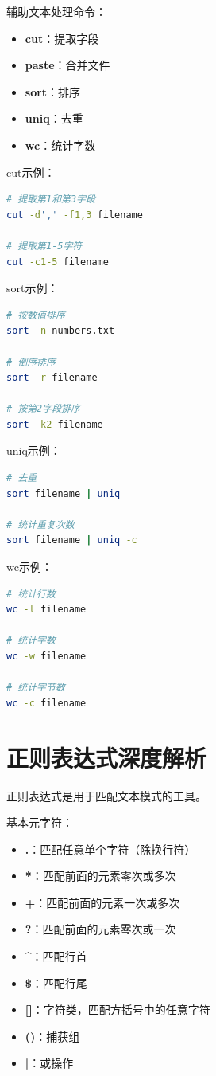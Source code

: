 \documentclass[12pt,UTF8]{ctexbook}
\begin{document}
辅助文本处理命令：

\begin{itemize}
    \item \textbf{cut}：提取字段
    \item \textbf{paste}：合并文件
    \item \textbf{sort}：排序
    \item \textbf{uniq}：去重
    \item \textbf{wc}：统计字数
\end{itemize}

cut示例：
\begin{lstlisting}[language=bash]
# 提取第1和第3字段
cut -d',' -f1,3 filename

# 提取第1-5字符
cut -c1-5 filename
\end{lstlisting}

sort示例：
\begin{lstlisting}[language=bash]
# 按数值排序
sort -n numbers.txt

# 倒序排序
sort -r filename

# 按第2字段排序
sort -k2 filename
\end{lstlisting}

uniq示例：
\begin{lstlisting}[language=bash]
# 去重
sort filename | uniq

# 统计重复次数
sort filename | uniq -c
\end{lstlisting}

wc示例：
\begin{lstlisting}[language=bash]
# 统计行数
wc -l filename

# 统计字数
wc -w filename

# 统计字节数
wc -c filename
\end{lstlisting}

\section{正则表达式深度解析}
\label{sec:regex}

正则表达式是用于匹配文本模式的工具。

基本元字符：
\begin{itemize}
    \item \textbf{.}：匹配任意单个字符（除换行符）
    \item \textbf{*}：匹配前面的元素零次或多次
    \item \textbf{+}：匹配前面的元素一次或多次
    \item \textbf{?}：匹配前面的元素零次或一次
    \item \textbf{\^{}}：匹配行首
    \item \textbf{\$}：匹配行尾
    \item \textbf{[]}：字符类，匹配方括号中的任意字符
    \item \textbf{()}：捕获组
    \item \textbf{|}：或操作
\end{itemize}
\end{document}
